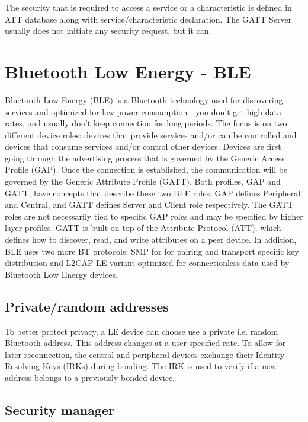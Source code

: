 \documentclass[a4paper,titlepage,oneside,12pt]{amsart} %
\begin{document}
The security that is required to access a service or a characteristic is defined in ATT database along with service/characteristic declaration. The GATT Server usually does not initiate any security request, but it can. 


\section{Bluetooth Low Energy - BLE}
Bluetooth Low Energy (BLE) is a Bluetooth technology used for discovering services and optimized for low power consumption - you don't get high data rates, and usually don't keep connection for long periods. The focus is on two different device roles:  devices that provide services and/or can be controlled and devices that consume services and/or control other devices. Devices are first going through the advertising process that is governed by the Generic Access Profile (GAP). Once the connection is established, the communication will be governed by the Generic Attribute Profile (GATT). Both profiles, GAP and GATT, have concepts that describe these two BLE roles:  GAP defines Peripheral and Central, and GATT defines Server and Client role respectively. The GATT roles are not necessarily tied to specific GAP roles and may be specified by higher layer profiles. GATT is built on top of the Attribute Protocol (ATT), which defines how to discover, read, and write attributes on a peer device. In addition, BLE uses two more BT protocols: SMP for for pairing and transport specific key distribution and L2CAP LE variant optimized for connectionless data used by Bluetooth Low Energy devices. 


\subsection{Private/random addresses}
To better protect privacy, a LE device can choose use a private i.e. random Bluetooth address. This address changes at a user-specified rate. To allow for later reconnection, the central and peripheral devices exchange their Identity Resolving Keys (IRKs) during bonding. The IRK is used to verify if a new address belongs to a previously bonded device.

\subsection{Security manager}
\label{section:security_manager}
\end{document}
